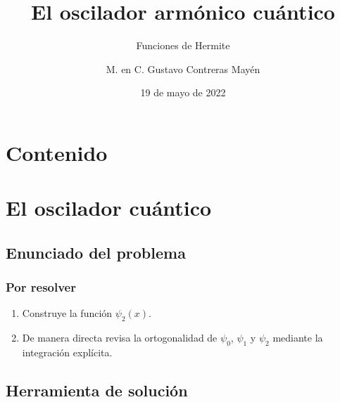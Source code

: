 \documentclass[12pt]{beamer}
\date{19 de mayo de 2022}
\title{\large{El oscilador armónico cuántico}}
\subtitle{Funciones de Hermite}
\author{M. en C. Gustavo Contreras Mayén}
\begin{document}
\maketitle
\fontsize{14}{14}\selectfont
{}

\section*{Contenido}

\section{El oscilador cuántico}
\subsection{Enunciado del problema}

\begin{frame}
\frametitle{Por resolver}
\begin{enumerate}[<+->]
\item Construye la función $\psi_{2} (x)$.
\item De manera directa revisa la ortogonalidad de $\psi_{0}$, $\psi_{1}$ y $\psi_{2}$ mediante la integración explícita.
\end{enumerate}
\end{frame}

\subsection{Herramienta de solución}
\end{document}

